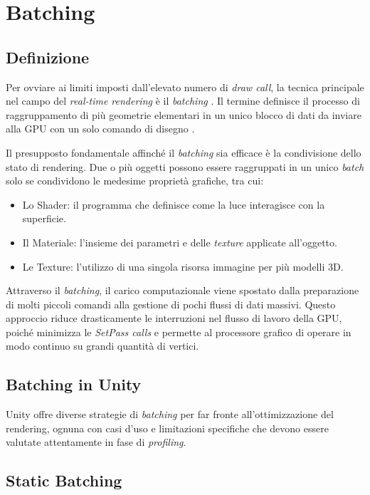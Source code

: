 \section{Batching}

\subsection{Definizione}

Per ovviare ai limiti imposti dall'elevato numero di \textit{draw call}, la tecnica principale nel campo del \textit{real-time rendering} è il \textit{batching} \cite{AkenineRealTimeRendering}. Il termine definisce il processo di raggruppamento di più geometrie elementari in un unico blocco di dati da inviare alla GPU con un solo comando di disegno \cite{GregoryGameEngine}.

Il presupposto fondamentale affinché il \textit{batching} sia efficace è la condivisione dello stato di rendering. Due o più oggetti possono essere raggruppati in un unico \textit{batch} solo se condividono le medesime proprietà grafiche, tra cui:
\begin{itemize}
    \item Lo Shader: il programma che definisce come la luce interagisce con la superficie.
    \item Il Materiale: l'insieme dei parametri e delle \textit{texture} applicate all'oggetto.
    \item Le Texture: l'utilizzo di una singola risorsa immagine per più modelli 3D.
\end{itemize}

Attraverso il \textit{batching}, il carico computazionale viene spostato dalla preparazione di molti piccoli comandi alla gestione di pochi flussi di dati massivi. Questo approccio riduce drasticamente le interruzioni nel flusso di lavoro della GPU, poiché minimizza le \textit{SetPass calls} e permette al processore grafico di operare in modo continuo su grandi quantità di vertici.

\subsection{Batching in Unity}

Unity offre diverse strategie di \textit{batching} per far fronte all'ottimizzazione del rendering, ognuna con casi d'uso e limitazioni specifiche che devono essere valutate attentamente in fase di \textit{profiling}.

\subsection{Static Batching}

